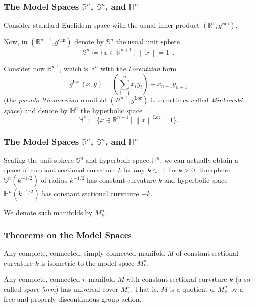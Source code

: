 \documentclass{beamer}
\DeclareMathOperator{\can}{can}
\DeclareMathOperator{\Lor}{Lor}
\newcommand{\Sp}{\mathbb{S}}
\newcommand{\Hy}{\mathbb{H}}
\newcommand{\R}{\mathbb{R}}
\newcommand{\norm}[1]{\left\lVert#1\right\rVert}
\theoremstyle{definition}
\begin{document}
\begin{frame}
    \frametitle{The Model Spaces $\R^n$, $\Sp^n$, and $\Hy^n$}

    Consider standard Euclidean space with the usual inner product $(\R^n, g^{\can})$.

    Now, in $(\R^{n+1}, g^{\can})$ denote by $\Sp^n$ the usual unit sphere
    \[
      \Sp^n \coloneqq \{x \in \R^{n+1} \mid \norm{x} = 1\}.
    \]

    Consider now $\R^{n,1}$, which is $\R^n$ with the \emph{Lorentzian} form
    \[
        g^{\Lor}(x,y) = \left(\sum_{i=1}^n x_i y_i\right) - x_{n+1}y_{n+1}
    \]
    (the \emph{pseudo-Riemannian} manifold $(R^{n,1},g^{\Lor})$ is sometimes
    called \emph{Minkowski space})
    and denote by $\Hy^n$ the hyperbolic space
    \[
      \Hy^n \coloneqq \{x \in \R^{n+1} \mid \norm{x}^{\Lor} = 1\}.
    \]
\end{frame}

\begin{frame}
    \frametitle{The Model Spaces $\R^n$, $\Sp^n$, and $\Hy^n$}

    Scaling the unit sphere $\Sp^n$ and hyperbolic space $\Hy^n$, we can
    actually obtain a space of constant sectional curvature $k$ for any
    $k \in \R$; for $k > 0$, the sphere $\Sp^n(k^{-1/2})$ of radius
    $k^{-1/2}$ has constant curvature $k$ and hyperbolic space
    $\Hy^n(k^{-1/2})$ has constant sectional curvature $-k$.

    We denote such manifolds by $M_k^n$.

\end{frame}

\begin{frame}
    \frametitle{Theorems on the Model Spaces}

    \begin{theorem}
        Any complete, connected, simply connected manifold $M$ of constant sectional
        curvature $k$ is isometric to the model space $M_k^n$.
    \end{theorem}

    \begin{theorem}
        Any complete, connected $n$-manifold $M$ with constant sectional curvature $k$
        (a so-called \emph{space form}) has universal cover $M_k^n$.
        That is, $M$ is a quotient of $M_k^n$ by a free and properly discontinuous
        group action.
    \end{theorem}
\end{frame}
\end{document}
